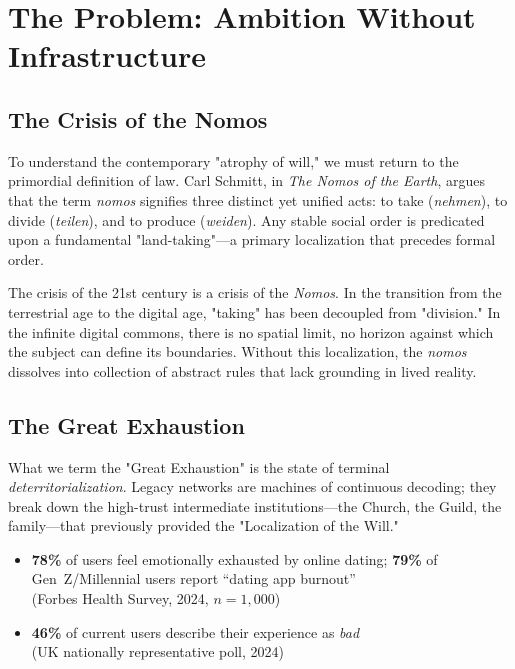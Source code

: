 \documentclass[11pt,a4paper]{article}
\begin{document}
\newpage
\section{The Problem: Ambition Without Infrastructure}

\subsection{The Crisis of the Nomos}
To understand the contemporary "atrophy of will," we must return to the primordial definition of law. Carl Schmitt, in \textit{The Nomos of the Earth}, argues that the term \textit{nomos} signifies three distinct yet unified acts: to take (\textit{nehmen}), to divide (\textit{teilen}), and to produce (\textit{weiden}). Any stable social order is predicated upon a fundamental "land-taking"—a primary localization that precedes formal order.

The crisis of the 21st century is a crisis of the \textit{Nomos}. In the transition from the terrestrial age to the digital age, "taking" has been decoupled from "division." In the infinite digital commons, there is no spatial limit, no horizon against which the subject can define its boundaries. Without this localization, the \textit{nomos} dissolves into collection of abstract rules that lack grounding in lived reality.

\subsection{The Great Exhaustion}
What we term the "Great Exhaustion" is the state of terminal \textit{deterritorialization}. Legacy networks are machines of continuous decoding; they break down the high-trust intermediate institutions—the Church, the Guild, the family—that previously provided the "Localization of the Will." 

\begin{statbox}
\begin{itemize}[nosep]
  \item \textbf{78\%} of users feel emotionally exhausted by online dating; \textbf{79\%} of Gen~Z/Millennial users report ``dating app burnout'' \\ {\small (Forbes Health Survey, 2024, $n=1{,}000$)}
  \item \textbf{46\%} of current users describe their experience as \textit{bad} \\ {\small (UK nationally representative poll, 2024)}
\end{itemize}
\end{statbox}
\end{document}
